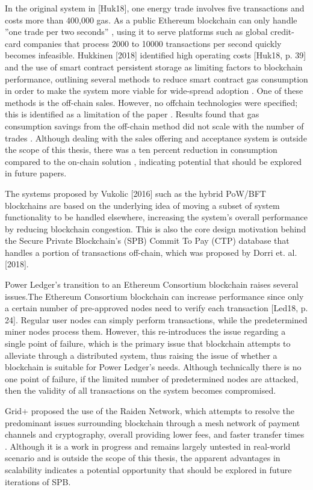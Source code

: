 In the original system in [Huk18], one energy trade involves five transactions and costs more than 400,000 gas. As a public Ethereum blockchain can only handle ”one trade per two seconds” \cite[p.37]{Huk18}, using it to serve platforms such as global credit-card companies that process 2000 to 10000 transactions per second \cite[p.2]{Vuk16} quickly becomes infeasible. Hukkinen [2018] identified high operating costs [Huk18, p. 39] and the use of smart contract persistent storage \cite[p.53]{Huk18} as limiting factors to blockchain performance, outlining several methods to reduce smart contract gas consumption in order to make the system more viable for wide-spread adoption \cite[p.40]{Huk18}. One of these methods is the off-chain sales. However, no offchain technologies were specified; this is identified as a limitation of the paper \cite[p.56]{Huk18}. Results found that gas consumption savings from the off-chain method did not scale with the number of trades \cite[p.48]{Huk18}. Although dealing with the sales offering and acceptance system is outside the scope of this thesis, there was a ten percent reduction in consumption compared to the on-chain solution \cite[p.52]{Huk18}, indicating potential that should be explored in future papers.

The systems proposed by Vukolic [2016] such as the hybrid PoW/BFT blockchains \cite[p.11]{Vuk16} are based on the underlying idea of moving a subset of system functionality to be handled elsewhere, increasing the system’s overall performance by reducing blockchain congestion. This is also the core design motivation behind the Secure Private Blockchain’s (SPB) Commit To Pay (CTP) database that handles a portion of transactions off-chain, which was proposed by Dorri et. al. [2018].

Power Ledger’s transition to an Ethereum Consortium blockchain raises several issues.The Ethereum Consortium blockchain can increase performance since only a certain number of pre-approved nodes need to verify each transaction [Led18, p. 24]. Regular user nodes can simply perform transactions, while the predetermined miner nodes process them. However, this re-introduces the issue regarding a single point of failure, which is the primary issue that blockchain attempts to alleviate through a distributed system, thus raising the issue of whether a blockchain is suitable for Power Ledger’s needs. Although technically there is no one point of failure, if the limited number of predetermined nodes are attacked, then the validity of all transactions on the system becomes compromised.

Grid+ proposed the use of the Raiden Network, which attempts to resolve the predominant issues surrounding blockchain through a mesh network of payment channels and cryptography, overall providing lower fees, and faster transfer times \cite{Net17}. Although it is a work in progress and remains largely untested in real-world scenario and is outside the scope of this thesis, the apparent advantages in scalability indicates a potential opportunity that should be explored in future iterations of SPB.
